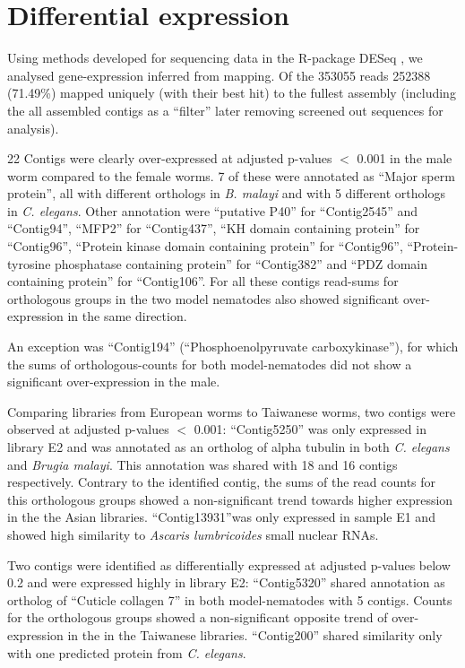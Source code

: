 \section{Differential expression}

Using methods developed for sequencing data in the R-package DESeq
\cite{pmid20979621}, we analysed gene-expression inferred from
mapping. Of the 353055 reads 252388 (71.49\%) mapped uniquely (with
their best hit) to the fullest assembly (including the all assembled
contigs as a ``filter'' later removing screened out sequences for
analysis).

22 Contigs were clearly over-expressed at adjusted p-values $<$ 0.001
in the male worm compared to the female worms.  7 of these were
annotated as ``Major sperm protein'', all with different orthologs in
\textit{B. malayi} and with 5 different orthologs in
\textit{C. elegans}. Other annotation were ``putative P40'' for
``Contig2545'' and ``Contig94'', ``MFP2'' for ``Contig437'', ``KH
domain containing protein'' for ``Contig96'', ``Protein kinase domain
containing protein'' for ``Contig96'', ``Protein-tyrosine phosphatase
containing protein'' for ``Contig382'' and ``PDZ domain containing
protein'' for ``Contig106''. For all these contigs read-sums for
orthologous groups in the two model nematodes also showed significant
over-expression in the same direction.

An exception was ``Contig194'' (``Phosphoenolpyruvate
carboxykinase''), for which the sums of orthologous-counts for both
model-nematodes did not show a significant over-expression in the
male.

Comparing libraries from European worms to Taiwanese worms, two
contigs were observed at adjusted p-values $<$ 0.001: ``Contig5250''
was only expressed in library E2 and was annotated as an ortholog of
alpha tubulin in both \textit{C. elegans} and \textit{Brugia
  malayi}. This annotation was shared with 18 and 16 contigs
respectively. Contrary to the identified contig, the sums of the read
counts for this orthologous groups showed a non-significant trend
towards higher expression in the the Asian
libraries. ``Contig13931''was only expressed in sample E1 and showed
high similarity to \textit{Ascaris lumbricoides} small nuclear RNAs.

Two contigs were identified as differentially expressed at adjusted
p-values below 0.2 and were expressed highly in library E2:
``Contig5320'' shared annotation as ortholog of ``Cuticle collagen 7''
in both model-nematodes with 5 contigs.  Counts for the orthologous
groups showed a non-significant opposite trend of over-expression in
the in the Taiwanese libraries.  ``Contig200'' shared similarity only
with one predicted protein from \textit{C. elegans}.

